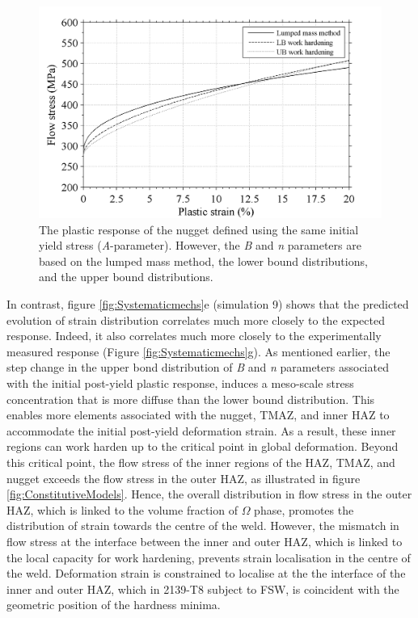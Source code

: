 \begin{figure}[h!]
	\centering
	\includegraphics[width=.8\linewidth]{Figures/ModellingMethod/Workhardeningaltered}
	\caption[Work hardening response]{The plastic response of the nugget defined using the same initial yield stress (\textit{A}-parameter). However, the \textit{B} and \textit{n} parameters are based on the lumped mass method, the lower bound distributions, and the upper bound distributions.}
	\label{fig:Workhardeningeffect}
\end{figure}

In contrast, figure \ref{fig:Systematicmechs}e (simulation 9) shows that the predicted evolution of strain distribution correlates much more closely to the expected response. Indeed, it also correlates much more closely to the experimentally measured response (Figure \ref{fig:Systematicmechs}g). As mentioned earlier, the step change in the upper bond distribution of \textit{B} and \textit{n} parameters associated with the initial post-yield plastic response, induces a meso-scale stress concentration that is more diffuse than the lower bound distribution. This enables more elements associated with the nugget, TMAZ, and inner HAZ to accommodate the initial post-yield deformation strain. As a result, these inner regions can work harden up to the critical point in global deformation. Beyond this critical point, the flow stress of the inner regions of the HAZ, TMAZ, and nugget exceeds the flow stress in the outer HAZ, as illustrated in figure \ref{fig:ConstitutiveModels}. Hence, the overall distribution in flow stress in the outer HAZ, which is linked to the volume fraction of $\Omega$ phase, promotes the distribution of strain towards the centre of the weld. However, the mismatch in flow stress at the interface between the inner and outer HAZ, which is linked to the local capacity for work hardening, prevents strain localisation in the centre of the weld. Deformation strain is constrained to localise at the the interface of the inner and outer HAZ, which in 2139-T8 subject to FSW, is coincident with the geometric position of the hardness minima. 

